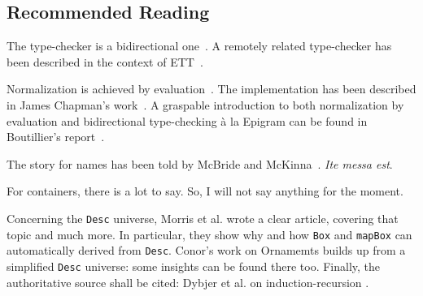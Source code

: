 \subsection{Recommended Reading}

The type-checker is a bidirectional
one~\cite{turner:bidirectional_tc}. A remotely related type-checker
has been described in the context of ETT~\cite{chapman:ett}.

Normalization is achieved by evaluation~\cite{dybjer:nbe,
  dybjer:dependent_types_work}. The implementation has been described
in James Chapman's work~\cite{chapman:phd}. A graspable introduction
to both normalization by evaluation and bidirectional type-checking
\`a la Epigram can be found in Boutillier's
report~\cite{boutillier:report}.

The story for names has been told by McBride and
McKinna~\cite{mcbride:free_variable}. \emph{Ite messa est}.

For containers, there is a lot to say. So, I will not say anything for
the moment.

Concerning the \verb|Desc| universe, Morris et al. \cite{morris:spf} wrote
a clear article, covering that topic and much more. In particular,
they show why and how \verb|Box| and \verb|mapBox| can automatically derived
from \verb|Desc|. Conor's work on Ornamemts \cite{mcbride:ornaments} builds
up from a simplified \verb|Desc| universe: some insights can be found there
too. Finally, the authoritative source shall be cited: Dybjer et
al. on induction-recursion \cite{dybjer:ir_axiom, dybjer:ir_algebra,
  dybjer:iir}.
